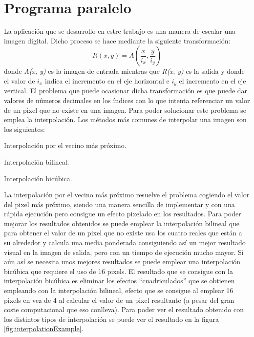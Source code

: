 \documentclass{article}
\begin{document}
\section{Programa paralelo}\label{sec:ParallelProgram}
{\setlength{\parskip}{0mm}
	La aplicación que se desarrollo en estre trabajo es una manera de escalar una imagen digital. Dicho proceso se hace mediante la siguiente transformación:
\begin{equation}
R(x, y) = A \left( \frac{x}{i_x}, \frac{y}{i_y} \right)
\end{equation}
donde \emph{A(x, y)} es la imagen de entrada mientras que \emph{R(x, y)} es la salida y donde el valor de $i_x$ indica el incremento en el eje horizontal 
e $i_y$ el incremento en el eje vertical. El problema que puede ocasionar dicha transformación es que puede dar valores de números decimales en 
los índices con lo que intenta referenciar un valor de un pixel que no existe en una imagen. Para poder solucionar este problema se emplea la interpolación. 
Los métodos más comunes de interpolar una imagen son los siguientes\cite{WOODS}:
\begin{enumerate} {\setlength{\parskip}{0mm}
	\item Interpolación por el vecino más próximo.
	\item Interpolación bilineal.
	\item Interpolación bicúbica.
} \end{enumerate}
}

	La interpolación por el vecino más próximo resuelve el problema cogiendo el valor del pixel más próximo, siendo una manera sencilla de implementar y con una rápida ejecución pero consigue un efecto pixelado en los resultados. Para poder mejorar los resultados obtenidos se puede emplear la interpolación bilineal que para obtener el valor de un pixel que no existe usa los cuatro reales que están a su alrededor y calcula una media ponderada consiguiendo así un mejor resultado visual en la imagen de salida, pero con un tiempo de ejecución mucho mayor. Si aún así se necesita unos mejores resultados se puede emplear una interpolación bicúbica que requiere el uso de 16 pixels. El resultado que se consigue con la interpolación bicúbica es eliminar los efectos ``cuadriculados'' que se obtienen empleando con la interpolación bilineal, efecto que se consigue al emplear 16 pixels en vez de 4 al calcular el valor de un pixel resultante (a pesar del gran coste computacional que eso conlleva). Para poder ver el resultado obtenido con los distintos tipos de interpolación se puede ver el resultado en la figura \ref{fig:interpolationExample}.
\end{document}
